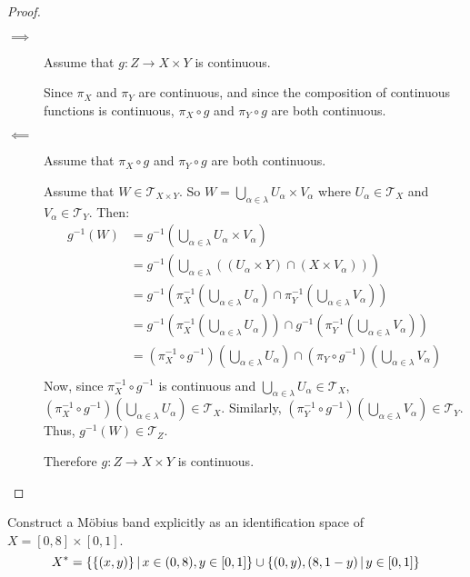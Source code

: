 \documentclass[letterpaper,12pt,fleqn]{article}
\newcommand{\T}{\mathscr{T}}
\renewcommand{\a}{\alpha}
\renewcommand{\l}{\lambda}
\begin{document}
\begin{proof}
  \begin{description}
  \item[]
  \item[\(\implies\)] Assume that \(g:Z\to X\times Y\) is continuous.

    Since \(\pi_X\) and \(\pi_Y\) are continuous, and since the composition of continuous functions is continuous,
    \(\pi_X\circ g\) and \(\pi_Y\circ g\) are both continuous.

  \item[\(\impliedby\)] Assume that \(\pi_X\circ g\) and \(\pi_Y\circ g\) are both continuous.

    Assume that \(W\in\T_{X\times Y}\).  So \(W=\bigcup_{\a\in\l}U_{\a}\times V_{\a}\) where \(U_{\a}\in\T_X\) and
    \(V_{\a}\in\T_Y\).  Then:
    \begin{align*}
      g^{-1}(W) &= g^{-1}(\bigcup_{\a\in\l}U_{\a}\times V_{\a}) \\
      &= g^{-1}(\bigcup_{\a\in\l}((U_{\a}\times Y)\cap(X\times V_{\a}))) \\
      &= g^{-1}(\pi_X^{-1}(\bigcup_{\a\in\l}U_{\a})\cap\pi_Y^{-1}(\bigcup_{\a\in\l}V_{\a})) \\
      &= g^{-1}(\pi_X^{-1}(\bigcup_{\a\in\l}U_{\a}))\cap g^{-1}(\pi_Y^{-1}(\bigcup_{\a\in\l}V_{\a})) \\
      &= (\pi_X^{-1}\circ g^{-1})(\bigcup_{\a\in\l}U_{\a})\cap (\pi_Y\circ g^{-1})(\bigcup_{\a\in\l}V_{\a}) \\
    \end{align*}
    Now, since \(\pi_X^{-1}\circ g^{-1}\) is continuous and \(\bigcup_{\a\in\l}U_{\a}\in\T_X\),
    \((\pi_X^{-1}\circ g^{-1})(\bigcup_{\a\in\l}U_{\a})\in\T_X\).  Similarly,
    \((\pi_Y^{-1}\circ g^{-1})(\bigcup_{\a\in\l}V_{\a})\in\T_Y\).  Thus, \(g^{-1}(W)\in\T_Z\).

    Therefore \(g:Z\to X\times Y\) is continuous.
  \end{description}
\end{proof}

\begin{example}[Exercise 7.44]
  Construct a M\"{o}bius band explicitly as an identification space of \(X=[0,8]\times[0,1]\).
  \[X^*=\left\{{\{(x,y)\}}\,\middle|\,{x\in(0,8),y\in[0,1]}\right\}\cup\left\{{{(0,y),(8,1-y)}}\,\middle|\,{y\in[0,1]}\right\}\]
\end{example}
\end{document}
